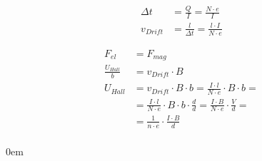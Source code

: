 \begin{align*}
  \Delta t &= \frac{Q}{I} = \frac{N \cdot e}{I} &\\
  v_{Drift} &= \frac{l}{\Delta t} = \frac{l \cdot I}{N \cdot e}
\end{align*}

\begin{align*}
  F_{el} &= F_{mag} &\\
  \frac{U_{Hall}}{b} &= v_{Drift} \cdot B &\\
  U_{Hall} &= v_{Drift} \cdot B \cdot b = \frac{I \cdot l}{N \cdot e} \cdot B \cdot b = &\\
  &= \frac{I \cdot l}{N \cdot e} \cdot B \cdot b \cdot \frac{d}{d} = \frac{I \cdot B}{N \cdot e}
  \cdot \frac{V}{d} = &\\
  &= \frac{1}{n \cdot e} \cdot \frac{I \cdot B}{d} &\\
\end{align*}

\leftskip0em
